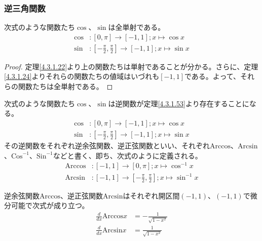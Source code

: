 \documentclass[dvipdfmx]{jsarticle}
\begin{document}
\subsubsection{逆三角関数}%
\begin{thm}\label{4.3.1.53} 次式のような関数たち$\cos$、$\sin$は全単射である。
\begin{align*}
\cos&:[ 0,\pi] \rightarrow [ - 1,1];x \mapsto \cos x\\
\sin&:\left[ - \frac{\pi}{2},\frac{\pi}{2} \right] \rightarrow [ - 1,1];x \mapsto \sin x
\end{align*}
\end{thm}
\begin{proof} 定理\ref{4.3.1.22}より上の関数たちは単射であることが分かる。さらに、定理\ref{4.3.1.24}よりそれらの関数たちの値域はいづれも$[ - 1,1]$である。よって、それらの関数たちは全単射である。
\end{proof}
\begin{dfn}
次式のような関数たち$\cos$、$\sin$は逆関数が定理\ref{4.3.1.53}より存在することになる。
\begin{align*}
\cos&:[ 0,\pi] \rightarrow [ - 1,1];x \mapsto \cos x\\
\sin&:\left[ - \frac{\pi}{2},\frac{\pi}{2} \right] \rightarrow [ - 1,1];x \mapsto \sin x
\end{align*}
その逆関数をそれぞれ逆余弦関数、逆正弦関数といい、それぞれ$\mathrm{Arccos}$、$\mathrm{Arcsin}$、${\mathrm{Cos}}^{- 1}$、${\mathrm{Sin}}^{- 1}$などと書く、即ち、次式のように定義される。
\begin{align*}
\mathrm{Arccos}&:[ - 1,1] \rightarrow [ 0,\pi];x \mapsto \cos^{- 1}x\\
\mathrm{Arcsin}&:[ - 1,1] \rightarrow \left[ - \frac{\pi}{2},\frac{\pi}{2} \right];x \mapsto \sin^{- 1}x
\end{align*}
\end{dfn}
\begin{thm}\label{4.3.1.54}
逆余弦関数$\mathrm{Arccos}$、逆正弦関数$\mathrm{Arcsin}$はそれぞれ開区間$( - 1,1)$、$( - 1,1)$で微分可能で次式が成り立つ。
\begin{align*}
\frac{d}{dx}{\mathrm{Arccos}}x &= - \frac{1}{\sqrt{1 - x^{2}}}\\
\frac{d}{dx}{\mathrm{Arcsin}}x &= \frac{1}{\sqrt{1 - x^{2}}}
\end{align*}
\end{thm}
\end{document}
